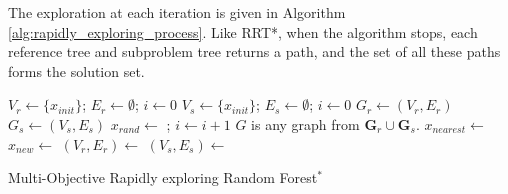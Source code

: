 \documentclass[conference]{IEEEtran}
\begin{document}
The exploration at each iteration is given in Algorithm \ref{alg:rapidly_exploring_process}.  Like RRT*, when the algorithm stops, each reference tree and subproblem tree returns a path, and the set of all these paths forms the solution set.

\begin{algorithm}
	\begin{algorithmic}[1]
		\State $ V_{r} \leftarrow \{ x_{init} \} $; $ E_{r} \leftarrow \emptyset $; $ i \leftarrow 0 $
		\EndFor
		\State $ V_{s} \leftarrow \{ x_{init} \} $; $ E_{s} \leftarrow \emptyset $; $ i \leftarrow 0 $
		\EndFor
		\State $ G_{r} \leftarrow (V_{r}, E_{r}) $
		\EndFor
		\State $ G_{s} \leftarrow (V_{s}, E_{s}) $
		\EndFor
		\State $ x_{rand} \leftarrow $  ; $ i \leftarrow i + 1 $
		\State $G$ is any graph from ${\mathbf G}_r\cup {\mathbf G}_s$.
		\State $ x_{nearest} \leftarrow $ 
		\State $ x_{new} \leftarrow $ 
		\State $ (V_{r}, E_{r}) \leftarrow $ 
		\EndFor
		\State $ (V_{s}, E_{s}) \leftarrow $ 
		\EndFor
		\EndIf
		\EndWhile
	\end{algorithmic}
	\caption{Multi-Objective Rapidly exploring Random Forest$^{*}$ }
	\label{alg:rapidly_exploring_process}
\end{algorithm}
\end{document}
